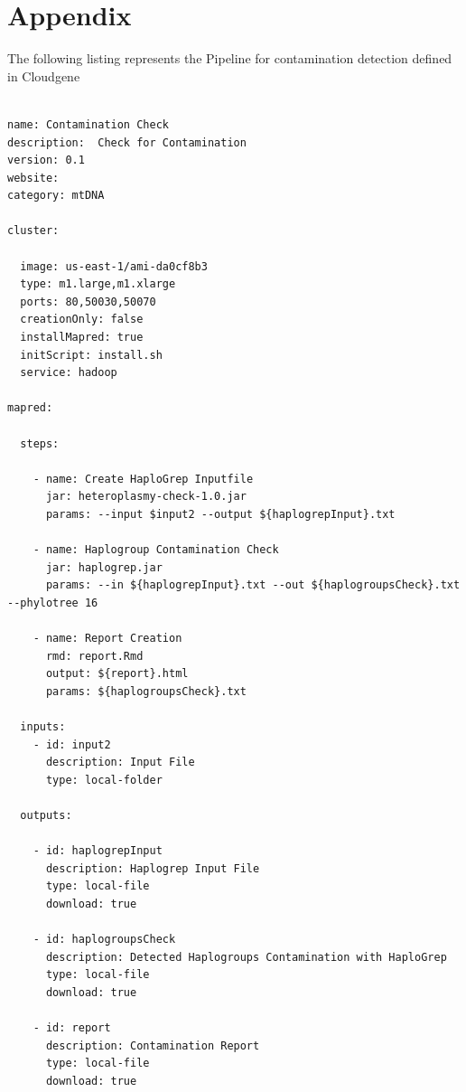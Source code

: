 \chapter{Appendix}


The following listing represents the Pipeline for contamination detection defined in Cloudgene 
\begin{lstlisting}[caption={Cloudgene YAML file, defining the HaploChecker Workflow}, label=appyaml]

name: Contamination Check
description:  Check for Contamination
version: 0.1
website: 
category: mtDNA

cluster:

  image: us-east-1/ami-da0cf8b3
  type: m1.large,m1.xlarge
  ports: 80,50030,50070
  creationOnly: false
  installMapred: true
  initScript: install.sh
  service: hadoop
 
mapred:

  steps:
 
    - name: Create HaploGrep Inputfile
      jar: heteroplasmy-check-1.0.jar
      params: --input $input2 --output ${haplogrepInput}.txt

    - name: Haplogroup Contamination Check
      jar: haplogrep.jar
      params: --in ${haplogrepInput}.txt --out ${haplogroupsCheck}.txt --phylotree 16

    - name: Report Creation
      rmd: report.Rmd
      output: ${report}.html
      params: ${haplogroupsCheck}.txt

  inputs:
    - id: input2
      description: Input File
      type: local-folder

  outputs:

    - id: haplogrepInput
      description: Haplogrep Input File
      type: local-file
      download: true

    - id: haplogroupsCheck
      description: Detected Haplogroups Contamination with HaploGrep
      type: local-file
      download: true

    - id: report
      description: Contamination Report
      type: local-file
      download: true 
\end{lstlisting}



